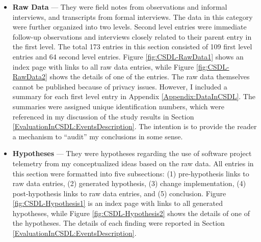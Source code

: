 \begin{itemize}
	\item \textbf{Raw Data} --- They were field notes from observations and informal interviews, and transcripts from formal interviews. The data in this category were further organized into two levels. Second level entries were immediate follow-up observations and interviews closely related to their parent entry in the first level. The total 173 entries in this section consisted of 109 first level entries and 64 second level entries. Figure \ref{fig:CSDL-RawData1} shows an index page with links to all raw data entries, while Figure \ref{fig:CSDL-RawData2} shows the details of one of the entries. The raw data themselves cannot be published because of privacy issues. However, I included a summary for each first level entry in Appendix \ref{Appendix:DataInCSDL}. The summaries were assigned unique identification numbers, which were referenced in my discussion of the study results in Section \ref{EvaluationInCSDL:EventsDescription}. The intention is to provide the reader a mechanism to ``audit'' my conclusions in some sense.

  \item \textbf{Hypotheses} --- They were hypotheses regarding the use of software project telemetry from my conceptualized ideas based on the raw data. All entries in this section were formatted into five subsections: (1) pre-hypothesis links to raw data entries, (2) generated hypothesis, (3) change implementation, (4) post-hypothesis links to raw data entries, and (5) conclusion. Figure \ref{fig:CSDL-Hypothesis1} is an index page with links to all generated hypotheses, while Figure \ref{fig:CSDL-Hypothesis2} shows the details of one of the hypotheses. The details of each finding were reported in Section \ref{EvaluationInCSDL:EventsDescription}.

\end{itemize}



